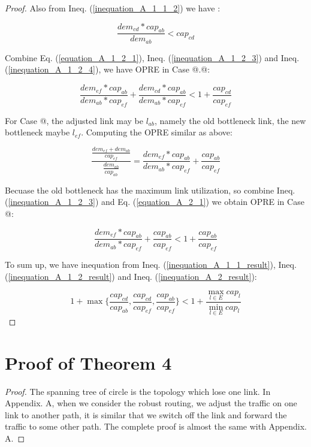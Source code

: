 \documentclass[conference]{IEEEtran}
\makeatletter
\newcommand{\Rmnum}[1]{\expandafter\@slowromancap\romannumeral #1@}
\makeatother
\begin{document}
\begin{proof}
Also from Ineq. (\ref{inequation_A_1_1_2}) we have :

\begin{equation}
\label{inequation_A_1_2_4}
\frac {dem_{cd} * cap_{ab}} {dem_{ab}} < cap_{cd}
\end{equation}

Combine Eq. (\ref{equation_A_1_2_1}), Ineq. (\ref{inequation_A_1_2_3}) and Ineq. (\ref{inequation_A_1_2_4}), we have OPRE in Case \Rmnum{1}.\Rmnum{2}:

\begin{equation}
\label{inequation_A_1_2_result}
\frac {dem_{ef} * cap_{ab}}{dem_{ab} * cap_{ef}} + \frac {dem_{cd} * cap_{ab}}{dem_{ab} * cap_{ef}}
< 1 + \frac {cap_{cd}}{cap_{ef}}
\end{equation}

For Case \Rmnum{2}, the adjusted link may be $l_{ab}$, namely the old bottleneck link, the new bottleneck
maybe $l_{ef}$. Computing the OPRE similar as above:

\begin{equation}
\label{equation_A_2_1}
\frac {\frac{dem_{ef} + dem_{ab}}{cap_{ef}}} {\frac{dem_{ab}}{cap_{ab}}} =
\frac {dem_{ef} * cap_{ab}}{dem_{ab} * cap_{ef}} + \frac{cap_{ab}}{cap_{ef}}
\end{equation}

Becuase the old bottleneck has the maximum link utilization, so combine Ineq. (\ref{inequation_A_1_2_3}) and Eq. (\ref{equation_A_2_1}) we obtain OPRE in Case
\Rmnum{2}:

\begin{equation}
\label{inequation_A_2_result}
\frac {dem_{ef} * cap_{ab}}{dem_{ab} * cap_{ef}} + \frac{cap_{ab}}{cap_{ef}} < 1 + \frac{cap_{ab}}{cap_{ef}}
\end{equation}


To sum up, we have inequation from Ineq. (\ref{inequation_A_1_1_result}), Ineq. (\ref{inequation_A_1_2_result}) and Ineq. (\ref{inequation_A_2_result}):

\begin{equation}
\label{inequation_A_result}
1 + \max \{\frac{cap_{cd}}{cap_{ab}}, \frac{cap_{cd}}{cap_{ef}}, \frac{cap_{ab}}{cap_{ef}} \} < 1 + \frac{\max_{l \in E} cap_{l}}{\min_{l \in E} cap_{l}}
\end{equation}

\end{proof}

\section{Proof of Theorem 4}
\begin{proof}
The spanning tree of circle is the topology which lose one link. In Appendix. A, when we consider the robust routing, we adjust the traffic
on one link to another path, it is similar that we switch off the link and forward the traffic to some other path. The complete proof is
almost the same with Appendix. A.
\end{proof}
\end{document}
